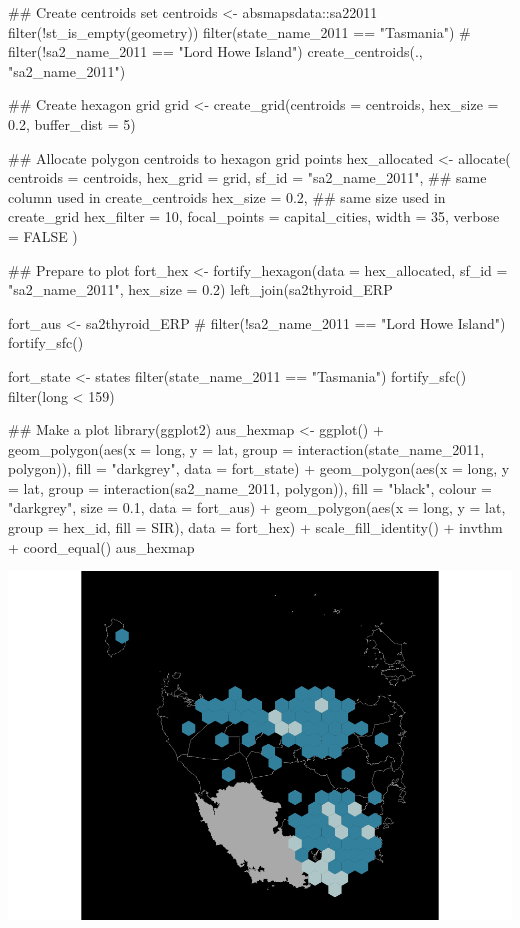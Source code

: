 \begin{Schunk}
\begin{Sinput}
## Create centroids set
centroids <- absmapsdata::sa22011 %
  filter(!st_is_empty(geometry)) %
  filter(state_name_2011 == "Tasmania") %
 # filter(!sa2_name_2011 == "Lord Howe Island") %
  create_centroids(., "sa2_name_2011")

## Create hexagon grid
grid <- create_grid(centroids = centroids,
                    hex_size = 0.2,
                    buffer_dist = 5)

## Allocate polygon centroids to hexagon grid points
hex_allocated <- allocate(
  centroids = centroids,
  hex_grid = grid,
  sf_id = "sa2_name_2011",
  ## same column used in create_centroids
  hex_size = 0.2,
  ## same size used in create_grid
  hex_filter = 10,
  focal_points = capital_cities,
  width = 35,
  verbose = FALSE
)

## Prepare to plot
fort_hex <- fortify_hexagon(data = hex_allocated,
                            sf_id = "sa2_name_2011",
                            hex_size = 0.2) %
            left_join(sa2thyroid_ERP %

fort_aus <- sa2thyroid_ERP %
 # filter(!sa2_name_2011 == "Lord Howe Island") %
  fortify_sfc()

fort_state <- states %
  filter(state_name_2011 == "Tasmania") %
  fortify_sfc() %
  filter(long < 159) 



## Make a plot
library(ggplot2)
aus_hexmap <- ggplot() +
  geom_polygon(aes(x = long,  y = lat, group = interaction(state_name_2011, polygon)),
               fill = "darkgrey",  data = fort_state) +
  geom_polygon(aes(x = long,  y = lat,  group = interaction(sa2_name_2011, polygon)),
               fill = "black",  colour = "darkgrey",  size = 0.1, data = fort_aus) +
  geom_polygon(aes(x = long, y = lat, group = hex_id, fill = SIR), data = fort_hex) +
  scale_fill_identity() +
  invthm + coord_equal()
aus_hexmap
\end{Sinput}

\includegraphics{kobakian-cook_files/figure-latex/fullhexmap-1} \end{Schunk}

